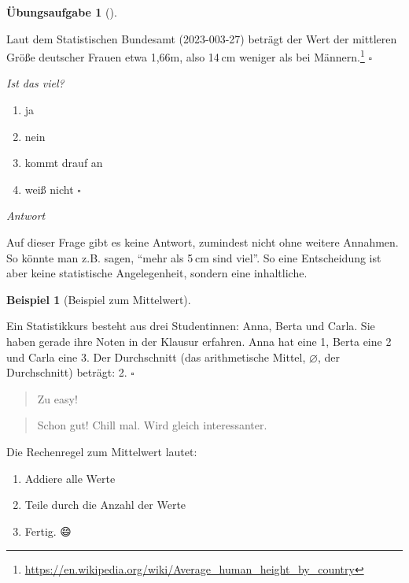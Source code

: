 \documentclass[
  letterpaper,
]{scrbook}
\providecommand{\tightlist}{%
  \setlength{\itemsep}{0pt}\setlength{\parskip}{0pt}}\usepackage{longtable,booktabs,array}
\theoremstyle{definition}
\newtheorem{example}{Beispiel}[chapter]
\theoremstyle{definition}
\theoremstyle{definition}
\newtheorem{exercise}{Übungsaufgabe}[chapter]
\theoremstyle{remark}
\begin{document}
\begin{exercise}[]\protect\hypertarget{exr-mw2}{}\label{exr-mw2}

Laut dem Statistischen Bundesamt (2023-003-27) beträgt der Wert der
mittleren Größe deutscher Frauen etwa 1,66m, also 14 cm weniger als bei
Männern.\footnote{\url{https://en.wikipedia.org/wiki/Average_human_height_by_country}}
\(\square\)

\emph{Ist das viel?}

\begin{enumerate}
\def\labelenumi{\alph{enumi})}
\tightlist
\item
  ja
\item
  nein
\item
  kommt drauf an
\item
  weiß nicht \(\square\)
\end{enumerate}

\emph{Antwort}

Auf dieser Frage gibt es keine Antwort, zumindest nicht ohne weitere
Annahmen. So könnte man z.B. sagen, ``mehr als 5 cm sind viel''. So eine
Entscheidung ist aber keine statistische Angelegenheit, sondern eine
inhaltliche.

\end{exercise}

\begin{example}[Beispiel zum
Mittelwert]\protect\hypertarget{exm-mw}{}\label{exm-mw}

Ein Statistikkurs besteht aus drei Studentinnen: Anna, Berta und Carla.
Sie haben gerade ihre Noten in der Klausur erfahren. Anna hat eine 1,
Berta eine 2 und Carla eine 3. Der Durchschnitt (das arithmetische
Mittel, \(\varnothing\), der Durchschnitt) beträgt: 2. \(\square\)

\end{example}

\begin{quote}
{} Zu easy!
\end{quote}

\begin{quote}
{} Schon gut! Chill mal. Wird gleich interessanter.
\end{quote}

Die Rechenregel zum Mittelwert lautet:

\begin{enumerate}
\def\labelenumi{\arabic{enumi}.}
\tightlist
\item
  Addiere alle Werte
\item
  Teile durch die Anzahl der Werte
\item
  Fertig. 😄
\end{enumerate}
\end{document}
